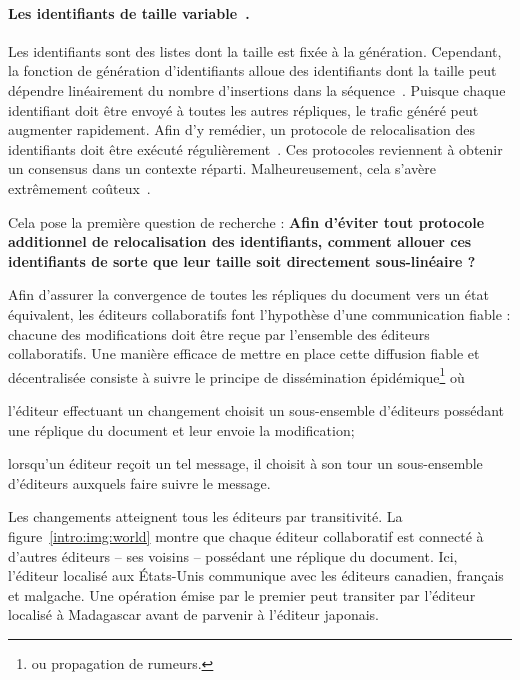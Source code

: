 \paragraph{Les identifiants de taille variable~\cite{weiss2009logoot}.} Les
identifiants sont des listes dont la taille est fixée à la
génération. Cependant, la fonction de génération d'identifiants alloue des
identifiants dont la taille peut dépendre linéairement du nombre d'insertions
dans la séquence~\cite{weiss2009logoot}.
Puisque chaque identifiant doit être envoyé à toutes les autres répliques, le
trafic généré peut augmenter rapidement.  Afin d'y remédier, un protocole de
relocalisation des identifiants doit être exécuté
régulièrement~\cite{zawirskiasynchronous}. Ces protocoles reviennent à obtenir
un consensus dans un contexte réparti. Malheureusement, cela s'avère extrêmement
coûteux~\cite{mostefaoui2015signature}.

Cela pose la première question de recherche : \textbf{Afin d'éviter tout
  protocole additionnel de relocalisation des identifiants, comment allouer ces
  identifiants de sorte que leur taille soit directement sous-linéaire ?}

Afin d'assurer la convergence de toutes les répliques du document vers un état
équivalent, les éditeurs collaboratifs font l'hypothèse d'une communication
fiable : chacune des modifications doit être reçue par l'ensemble des éditeurs
collaboratifs.
Une manière efficace de mettre en place cette diffusion fiable et décentralisée
consiste à suivre le principe de dissémination épidémique\footnote{ou propagation
  de rumeurs.}  où
\begin{inparaenum}[(i)]
\item l'éditeur effectuant un changement choisit un sous-ensemble d'éditeurs
  possédant une réplique du document et leur envoie la modification;
\item lorsqu'un éditeur reçoit un tel message, il choisit à son tour un
  sous-ensemble d'éditeurs auxquels faire suivre le message.
\end{inparaenum}
Les changements atteignent tous les éditeurs par transitivité.
La figure~\ref{intro:img:world} montre que chaque éditeur collaboratif est
connecté à d'autres éditeurs -- ses voisins -- possédant une réplique du
document. Ici, l'éditeur localisé aux États-Unis communique avec les éditeurs
canadien, français et malgache.
Une opération émise par le premier peut transiter par l'éditeur localisé à
Madagascar avant de parvenir à l'éditeur japonais. 



